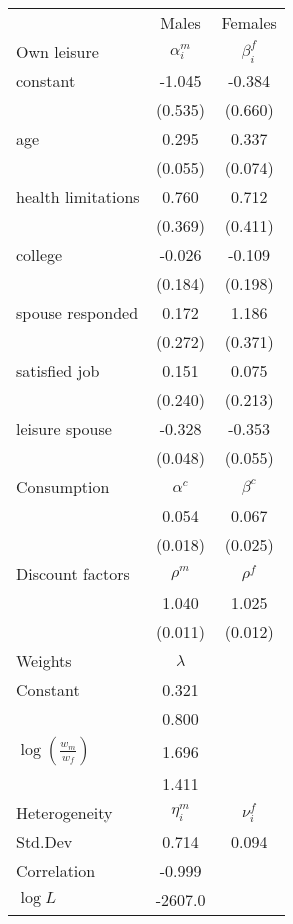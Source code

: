 \begin{tabular}{lcc} 
\hline\hline 
 & Males & Females \\ 
Own leisure & $\alpha_{i}^{m}$ & $\beta_{i}^{f}$ \\ 
constant & -1.045 & -0.384 \\ 
 & (0.535) & (0.660) \\ 
age & 0.295 & 0.337 \\ 
 & (0.055) & (0.074) \\ 
health limitations & 0.760 & 0.712 \\ 
 & (0.369) & (0.411) \\ 
college & -0.026 & -0.109 \\ 
 & (0.184) & (0.198) \\ 
spouse responded & 0.172 & 1.186 \\ 
 & (0.272) & (0.371) \\ 
satisfied job & 0.151 & 0.075 \\ 
 & (0.240) & (0.213) \\ 
leisure spouse & -0.328 & -0.353 \\ 
 & (0.048) & (0.055) \\ 
Consumption & $\alpha^{c}$ & $\beta^{c}$ \\ 
 & 0.054 & 0.067 \\ 
 & (0.018) & (0.025) \\ 
Discount factors & $\rho^m$ & $\rho^f$ \\ 
 & 1.040 & 1.025 \\ 
 & (0.011) & (0.012) \\ 
Weights & $\lambda$ &  \\ 
Constant & 0.321 &  \\ 
 & 0.800 &  \\ 
$\log(\frac{w_m}{w_f})$ & 1.696 &  \\ 
 & 1.411 &  \\ 
Heterogeneity & $\eta_i^m$ & $\nu_i^f$ \\ 
Std.Dev & 0.714 & 0.094 \\ 
Correlation & -0.999 &  \\ 
\hline 
$\log L$ & -2607.0 & \\ 
\hline \hline 
\end{tabular} 

